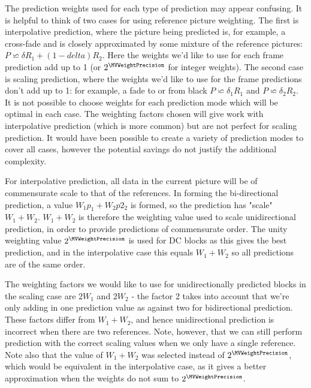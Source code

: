 \begin{informative}
The prediction weights used for each type of prediction may appear confusing. It is helpful
to think of two cases for using reference picture weighting. The first is interpolative 
prediction, where the picture being predicted is, for example, a cross-fade and is
closely approximated by some mixture of the reference pictures:
 $P\backsimeq\delta R_1+(1-delta)R_2$. Here the weights we'd like to
use for each frame prediction add up to 1 (or $2^\MVWeightPrecision$ for integer weights). 
The second case is scaling prediction, where 
the weights we'd like to use for the frame predictions don't add up to 1: for example,
a fade to or from black
$P\backsimeq\delta_1 R_1$ and $P\backsimeq\delta_2 R_2$. It is not possible to choose 
weights for each prediction mode which will be optimal in each case. The weighting
factors chosen will give work with interpolative prediction (which is more common) 
but are not perfect for scaling prediction. It would have been possible to create a variety of
prediction modes to cover all cases, however the potential savings do not justify the
additional complexity.

For interpolative prediction, all data in the current picture will be of commensurate scale to
that of the references. In forming the bi-directional prediction, a value $W_1 p_1 + W_2 p2_2$ is 
formed, so the prediction has "scale" $W_1+W_2$. $W_1+W_2$ is 
therefore the weighting value used to scale unidirectional prediction, in order to provide
predictions of commensurate order. The unity weighting value $2^\MVWeightPrecision$ is used
for DC blocks as this gives the best prediction, and in the interpolative case this equals $W_1+W_2$
so all predictions are of the same order.

The weighting factors we would like to use for unidirectionally predicted blocks in the scaling case
are $2W_1$ and $2W_2$ - the factor 2 takes into account that we're only adding in one prediction
value as against two for bidirectional prediction. These factors differ from $W_1+W_2$, and hence
unidirectional prediction is incorrect when there are two references. Note, however, that we can
still perform prediction with the correct scaling values when we only have a single reference. Note
also that the value of $W_1+W_2$ was selected instead of $2^\MVWeightPrecision$, which
would be equivalent in the interpolative case, as it gives a better approximation when the
weights do not sum to $2^\MVWeightPrecision$.
\end{informative}

